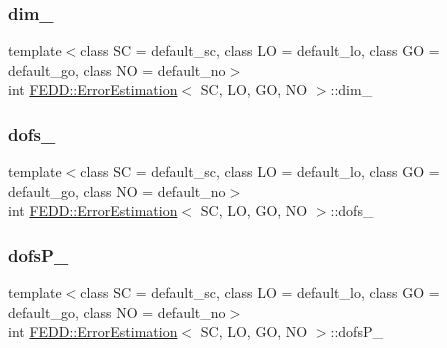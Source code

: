 \subsubsection{\texorpdfstring{dim\+\_\+}{dim\_}}
{\footnotesize\ttfamily template$<$class SC = default\+\_\+sc, class LO = default\+\_\+lo, class GO = default\+\_\+go, class NO = default\+\_\+no$>$ \\
int \hyperlink{classFEDD_1_1ErrorEstimation}{F\+E\+D\+D\+::\+Error\+Estimation}$<$ SC, LO, GO, NO $>$\+::dim\+\_\+}

\mbox{\label{classFEDD_1_1ErrorEstimation_a6c48449bc47150de2da8526dfc0c4cb0}} 
\subsubsection{\texorpdfstring{dofs\+\_\+}{dofs\_}}
{\footnotesize\ttfamily template$<$class SC = default\+\_\+sc, class LO = default\+\_\+lo, class GO = default\+\_\+go, class NO = default\+\_\+no$>$ \\
int \hyperlink{classFEDD_1_1ErrorEstimation}{F\+E\+D\+D\+::\+Error\+Estimation}$<$ SC, LO, GO, NO $>$\+::dofs\+\_\+\hspace{0.3cm}{\ttfamily [protected]}}

\mbox{\label{classFEDD_1_1ErrorEstimation_a43149de05f9bbcb89792f6d8e8fa39ec}} 
\subsubsection{\texorpdfstring{dofs\+P\+\_\+}{dofsP\_}}
{\footnotesize\ttfamily template$<$class SC = default\+\_\+sc, class LO = default\+\_\+lo, class GO = default\+\_\+go, class NO = default\+\_\+no$>$ \\
int \hyperlink{classFEDD_1_1ErrorEstimation}{F\+E\+D\+D\+::\+Error\+Estimation}$<$ SC, LO, GO, NO $>$\+::dofs\+P\+\_\+\hspace{0.3cm}{\ttfamily [protected]}}

\mbox{\label{classFEDD_1_1ErrorEstimation_a522bd10ea24ae844bd38ad644fec5dc4}} 
